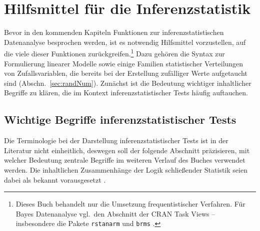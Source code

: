 \chapter{Hilfsmittel für die Inferenzstatistik}
\label{sec:prepStat}

Bevor in den kommenden Kapiteln Funktionen zur inferenzstatistischen Datenanalyse besprochen werden, ist es notwendig Hilfsmittel vorzustellen, auf die viele dieser Funktionen zurückgreifen.\footnote{Dieses Buch behandelt nur die Umsetzung frequentistischer Verfahren. Für Bayes Datenanalyse \cite{Kruschke2015,McElreath2015} vgl.\ den Abschnitt  der CRAN Task Views \cite{CRANtvBayes} -- insbesondere die Pakete \lstinline!rstanarm! \cite{Gabry2016} und \lstinline!brms! \cite{Buerkner2016}.} Dazu gehören die Syntax zur Formulierung linearer Modelle sowie einige Familien statistischer Verteilungen von Zufallsvariablen, die bereits bei der Erstellung zufälliger Werte aufgetaucht sind (Abschn.\ \ref{sec:randNum}). Zunächst ist die Bedeutung wichtiger inhaltlicher Begriffe zu klären, die im Kontext inferenzstatistischer Tests häufig auftauchen.

\section{Wichtige Begriffe inferenzstatistischer Tests}
\label{sec:infStatDef}

Die Terminologie bei der Darstellung inferenzstatistischer Tests ist in der Literatur nicht einheitlich, deswegen soll der folgende Abschnitt präzisieren, mit welcher Bedeutung zentrale Begriffe im weiteren Verlauf des Buches verwendet werden. Die inhaltlichen Zusammenhänge der Logik schließender Statistik seien dabei als bekannt vorausgesetzt \cite{Eid2010}.

